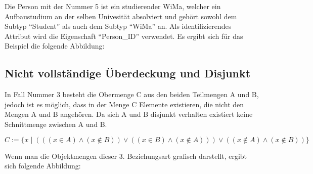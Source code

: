           Die Person mit der Nummer 5 ist ein studierender WiMa, welcher ein Aufbaustudium an der selben Univesit\"at absolviert und geh\"ort sowohl dem Subtyp \enquote{Student} als auch dem Subtyp \enquote{WiMa} an. Als identifizierendes Attribut wird die Eigenschaft \enquote{Person\_ID} verwendet. Es ergibt sich f\"ur das Beispiel die folgende Abbildung:
          \begin{center}
          \end{center}
\vspace{\baselineskip}
          \begin{center}
          \end{center}
      \subsection{Nicht vollst\"andige \"Uberdeckung und Disjunkt}
        In Fall Nummer 3 besteht die Obermenge C aus den beiden Teilmengen A und B, jedoch ist es m\"oglich, dass in der Menge C Elemente existieren, die nicht den Mengen A und B angeh\"oren. Da sich A und B disjunkt verhalten existiert keine Schnittmenge zwischen A und B.

        $C := \{x \mid (((x \in A) \wedge (x \notin B)) \vee ((x \in B) \wedge (x \notin A))) \vee ((x \notin A) \wedge (x \notin B))\}$

        Wenn man die Objektmengen dieser 3. Beziehungsart grafisch darstellt, ergibt sich folgende Abbildung:

